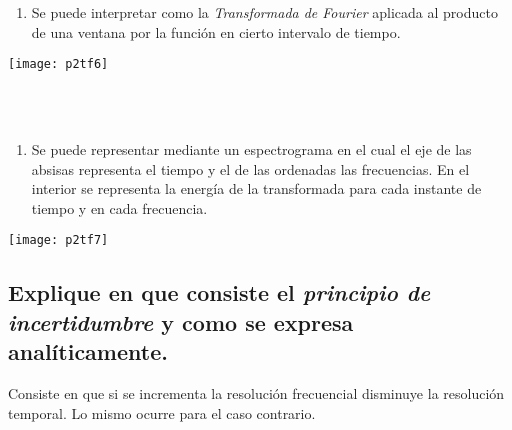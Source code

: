 \documentclass[a4paper,10pt,spanish,oneside]{article}
\begin{document}
\begin{minipage}{0.3\linewidth}

\begin{enumerate}[1.]

\item Se puede interpretar como la \textit{Transformada de Fourier} aplicada al producto de una ventana por la función en cierto intervalo de tiempo.

\end{enumerate}

\end{minipage} \hfill \begin{minipage}{0.6\linewidth}

\begin{center}
\texttt{[image: p2tf6]}
\end{center}

\end{minipage} \\ \\

\begin{minipage}{0.3\linewidth}

\begin{enumerate}[2.]

\item Se puede representar mediante un espectrograma en el cual el eje de las absisas representa el tiempo y el de las ordenadas las frecuencias. En el interior se representa la energía de la transformada para cada instante de tiempo y en cada frecuencia.

\end{enumerate}

\end{minipage} \hfill \begin{minipage}{0.6\linewidth}

\begin{center}
\texttt{[image: p2tf7]}
\end{center}

\end{minipage}

\subsection{Explique en que consiste el \textit{principio de incertidumbre} y como se expresa analíticamente.} 

Consiste en que si se incrementa la resolución frecuencial disminuye la resolución temporal. Lo mismo ocurre para el caso contrario.
\end{document}
